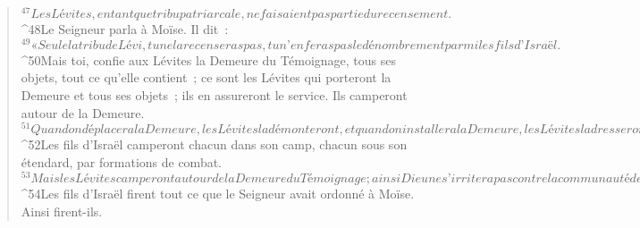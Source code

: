 \begin{verse}
${}^{47}Les Lévites, en tant que tribu patriarcale, ne faisaient pas partie du recensement.
${}^{48}Le Seigneur parla à Moïse. Il dit : 
${}^{49}« Seule la tribu de Lévi, tu ne la recenseras pas, tu n’en feras pas le dénombrement parmi les fils d’Israël. 
${}^{50}Mais toi, confie aux Lévites la Demeure du Témoignage, tous ses objets, tout ce qu’elle contient ; ce sont les Lévites qui porteront la Demeure et tous ses objets ; ils en assureront le service. Ils camperont autour de la Demeure. 
${}^{51}Quand on déplacera la Demeure, les Lévites la démonteront, et quand on installera la Demeure, les Lévites la dresseront. Le profane qui approchera sera mis à mort.
${}^{52}Les fils d’Israël camperont chacun dans son camp, chacun sous son étendard, par formations de combat. 
${}^{53}Mais les Lévites camperont autour de la Demeure du Témoignage ; ainsi Dieu ne s’irritera pas contre la communauté des fils d’Israël. Les Lévites prendront soin de la Demeure du Témoignage. »
${}^{54}Les fils d’Israël firent tout ce que le Seigneur avait ordonné à Moïse. Ainsi firent-ils.
      

\end{verse}

